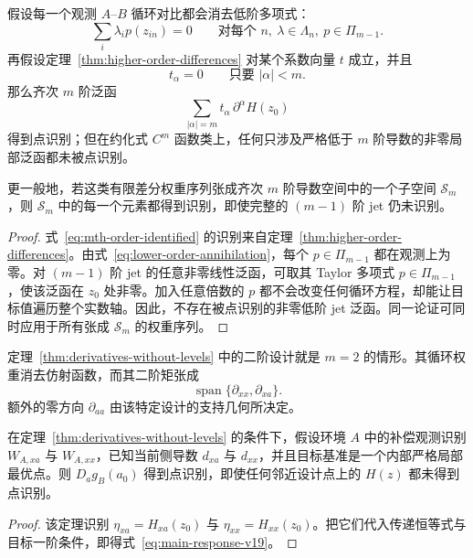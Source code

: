 \begin{theorem}[不恢复低阶信息的高阶识别]
\label{thm:order-separation}
假设每一个观测 $A$--$B$ 循环对比都会消去低阶多项式：
\begin{equation}
\sum_i\lambda_i p(z_{in})=0
\qquad
\text{对每个 }n,\ \lambda\in\Lambda_n,\ p\in\Pi_{m-1}.
\label{eq:lower-order-annihilation}
\end{equation}
再假设定理~\ref{thm:higher-order-differences} 对某个系数向量 $t$ 成立，并且
\[
t_\alpha=0
\qquad\text{只要 }|\alpha|<m.
\]
那么齐次 $m$ 阶泛函
\begin{equation}
\boxed{
\sum_{|\alpha|=m}
t_\alpha\,\partial^\alpha H(z_0)}
\label{eq:mth-order-identified}
\end{equation}
得到点识别；但在约化式 $C^m$ 函数类上，任何只涉及严格低于 $m$ 阶导数的非零局部泛函都未被点识别。

更一般地，若这类有限差分权重序列张成齐次 $m$ 阶导数空间中的一个子空间 $\mathcal S_m$，则 $\mathcal S_m$ 中的每一个元素都得到识别，即使完整的 $(m-1)$ 阶 jet 仍未识别。
\end{theorem}

\begin{proof}
式~\eqref{eq:mth-order-identified} 的识别来自定理~\ref{thm:higher-order-differences}。由式~\eqref{eq:lower-order-annihilation}，每个 $p\in\Pi_{m-1}$ 都在观测上为零。对 $(m-1)$ 阶 jet 的任意非零线性泛函，可取其 Taylor 多项式 $p\in\Pi_{m-1}$，使该泛函在 $z_0$ 处非零。加入任意倍数的 $p$ 都不会改变任何循环方程，却能让目标值遍历整个实数轴。因此，不存在被点识别的非零低阶 jet 泛函。同一论证可同时应用于所有张成 $\mathcal S_m$ 的权重序列。
\end{proof}

定理~\ref{thm:derivatives-without-levels} 中的二阶设计就是 $m=2$ 的情形。其循环权重消去仿射函数，而其二阶矩张成
\[
\operatorname{span}\{\partial_{xx},\partial_{xa}\}.
\]
额外的零方向 $\partial_{aa}$ 由该特定设计的支持几何所决定。

\begin{corollary}[不恢复水平值的反事实比较静态]
\label{cor:response-without-levels}
在定理~\ref{thm:derivatives-without-levels} 的条件下，假设环境 $A$ 中的补偿观测识别 $W_{A,xa}$ 与 $W_{A,xx}$，已知当前侧导数 $d_{xa}$ 与 $d_{xx}$，并且目标基准是一个内部严格局部最优点。则 $D_ag_B(a_0)$ 得到点识别，即使任何邻近设计点上的 $H(z)$ 都未得到点识别。
\end{corollary}

\begin{proof}
该定理识别 $\eta_{xa}=H_{xa}(z_0)$ 与 $\eta_{xx}=H_{xx}(z_0)$。把它们代入传递恒等式与目标一阶条件，即得式~\eqref{eq:main-response-v19}。
\end{proof}

